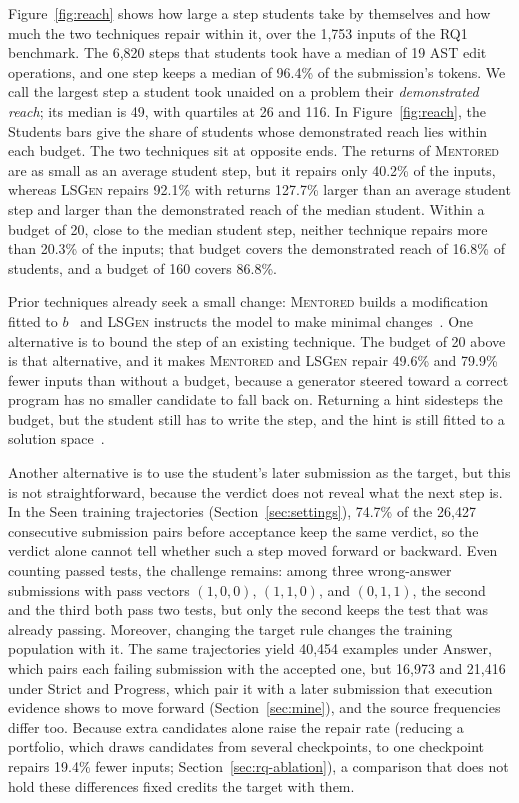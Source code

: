 \documentclass[10pt,conference]{IEEEtran}
\begin{document}
Figure~\ref{fig:reach} shows how large a step students take by themselves and how much the two techniques repair within it, over the 1,753 inputs of the RQ1 benchmark. The 6,820 steps that students took have a median of 19 AST edit operations, and one step keeps a median of 96.4\% of the submission's tokens. We call the largest step a student took unaided on a problem their \emph{demonstrated reach}; its median is 49, with quartiles at 26 and 116. In Figure~\ref{fig:reach}, the Students bars give the share of students whose demonstrated reach lies within each budget. The two techniques sit at opposite ends. The returns of \textsc{Mentored} are as small as an average student step, but it repairs only 40.2\% of the inputs, whereas \textsc{LSGen} repairs 92.1\% with returns 127.7\% larger than an average student step and larger than the demonstrated reach of the median student. Within a budget of 20, close to the median student step, neither technique repairs more than 20.3\% of the inputs; that budget covers the demonstrated reach of 16.8\% of students, and a budget of 160 covers 86.8\%.

Prior techniques already seek a small change: \textsc{Mentored} builds a modification fitted to \(b\)~\cite{choi2025automated} and \textsc{LSGen} instructs the model to make minimal changes~\cite{dai2026learner}. One alternative is to bound the step of an existing technique. The budget of 20 above is that alternative, and it makes \textsc{Mentored} and \textsc{LSGen} repair 49.6\% and 79.9\% fewer inputs than without a budget, because a generator steered toward a correct program has no smaller candidate to fall back on. Returning a hint sidesteps the budget, but the student still has to write the step, and the hint is still fitted to a solution space~\cite{rivers2017data,price2017isnap,roest2024next}.

Another alternative is to use the student's later submission as the target, but this is not straightforward, because the verdict does not reveal what the next step is. In the Seen training trajectories (Section~\ref{sec:settings}), 74.7\% of the 26,427 consecutive submission pairs before acceptance keep the same verdict, so the verdict alone cannot tell whether such a step moved forward or backward. Even counting passed tests, the challenge remains: among three wrong-answer submissions with pass vectors \((1,0,0)\), \((1,1,0)\), and \((0,1,1)\), the second and the third both pass two tests, but only the second keeps the test that was already passing. Moreover, changing the target rule changes the training population with it. The same trajectories yield 40,454 examples under Answer, which pairs each failing submission with the accepted one, but 16,973 and 21,416 under Strict and Progress, which pair it with a later submission that execution evidence shows to move forward (Section~\ref{sec:mine}), and the source frequencies differ too. Because extra candidates alone raise the repair rate (reducing a portfolio, which draws candidates from several checkpoints, to one checkpoint repairs 19.4\% fewer inputs; Section~\ref{sec:rq-ablation}), a comparison that does not hold these differences fixed credits the target with them.
\end{document}

